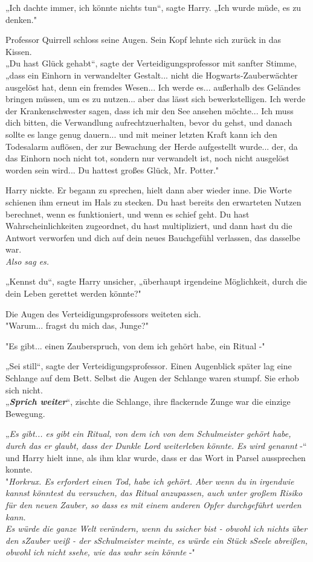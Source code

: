 {„Ich dachte immer, ich könnte nichts tun“, sagte Harry. „Ich wurde müde, es zu denken."

Professor Quirrell schloss seine Augen. Sein Kopf lehnte sich zurück in das Kissen.\\ „Du hast Glück gehabt“, sagte der Verteidigungsprofessor mit sanfter Stimme,\\ „dass ein Einhorn in verwandelter Gestalt... nicht die Hogwarts-Zauberwächter ausgelöst hat, denn ein fremdes Wesen... Ich werde es... außerhalb des Geländes bringen müssen, um es zu nutzen... aber das lässt sich bewerkstelligen. Ich werde der Krankenschwester sagen, dass ich mir den See ansehen möchte... Ich muss dich bitten, die Verwandlung aufrechtzuerhalten, bevor du gehst, und danach sollte es lange genug dauern... und mit meiner letzten Kraft kann ich den Todesalarm auflösen, der zur Bewachung der Herde aufgestellt wurde... der, da das Einhorn noch nicht tot, sondern nur verwandelt ist, noch nicht ausgelöst worden sein wird... Du hattest großes Glück, Mr. Potter."

Harry nickte. Er begann zu sprechen, hielt dann aber wieder inne. Die Worte schienen ihm erneut im Hals zu stecken. Du hast bereits den erwarteten Nutzen berechnet, wenn es funktioniert, und wenn es schief geht. Du hast Wahrscheinlichkeiten zugeordnet, du hast multipliziert, und dann hast du die Antwort verworfen und dich auf dein neues Bauchgefühl verlassen, das dasselbe war.\\ \emph{Also sag es.}

„Kennst du“, sagte Harry unsicher, „überhaupt irgendeine Möglichkeit, durch die dein Leben gerettet werden könnte?"

Die Augen des Verteidigungsprofessors weiteten sich.\\ "Warum... fragst du mich das, Junge?"

"Es gibt... einen Zauberspruch, von dem ich gehört habe, ein Ritual -"

„Sei still“, sagte der Verteidigungsprofessor. Einen Augenblick später lag eine Schlange auf dem Bett. Selbst die Augen der Schlange waren stumpf. Sie erhob sich nicht.\\ „\textbf{\emph{Sprich weiter}}“, zischte die Schlange, ihre flackernde Zunge war die einzige Bewegung.

„\emph{Es gibt... es gibt ein Ritual, von dem ich von dem Schulmeister gehört habe, durch das er glaubt, dass der Dunkle Lord weiterleben könnte. Es wird genannt} -“ und Harry hielt inne, als ihm klar wurde, dass er das Wort in Parsel aussprechen konnte.\\ "\emph{Horkrux. Es erfordert einen Tod, habe ich gehört. Aber wenn du in irgendwie kannst könntest du versuchen, das Ritual anzupassen, auch unter großem Risiko für den neuen Zauber, so dass es mit einem anderen Opfer durchgeführt werden kann.\\ Es würde die ganze Welt verändern, wenn du ssicher bist - obwohl ich nichts über den sZauber weiß - der sSchulmeister meinte, es würde ein Stück sSeele abreißen, obwohl ich nicht ssehe, wie das wahr sein könnte} -"

}
